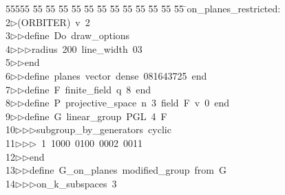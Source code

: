 %
%
\begin{tabbing}
55555 \= 55 \= 55 \= 55 \= 55 \= 55 \= 55 \= 55 \= 55 \= 55 \= 55 \= 55 \= 55 \= \>on\_planes\_restricted:\\[0pt]
2\>$\triangleright$\>(ORBITER)\ v\ 2\ \\[0pt]
3\>$\triangleright$\>$\triangleright$\>define\ Do\ draw\_options\ \\[0pt]
4\>$\triangleright$\>$\triangleright$\>$\triangleright$\>radius\ 200\ line\_width\ 03\ \\[0pt]
5\>$\triangleright$\>$\triangleright$\>end\ \\[0pt]
6\>$\triangleright$\>$\triangleright$\>define\ planes\ vector\ dense\ 081643725\ end\ \\[0pt]
7\>$\triangleright$\>$\triangleright$\>define\ F\ finite\_field\ q\ 8\ end\ \\[0pt]
8\>$\triangleright$\>$\triangleright$\>define\ P\ projective\_space\ n\ 3\ field\ F\ v\ 0\ end\ \\[0pt]
9\>$\triangleright$\>$\triangleright$\>define\ G\ linear\_group\ PGL\ 4\ F\ \\[0pt]
10\>$\triangleright$\>$\triangleright$\>$\triangleright$\>subgroup\_by\_generators\ cyclic\ \\[0pt]
11\>$\triangleright$\>$\triangleright$\>$\triangleright$\ 1\ 1000\ 0100\ 0002\ 0011\ \\[0pt]
12\>$\triangleright$\>$\triangleright$\>end\ \\[0pt]
13\>$\triangleright$\>$\triangleright$\>define\ G\_on\_planes\ modified\_group\ from\ G\ \\[0pt]
14\>$\triangleright$\>$\triangleright$\>$\triangleright$\>on\_k\_subspaces\ 3\ \\[0pt]

\end{tabbing}

